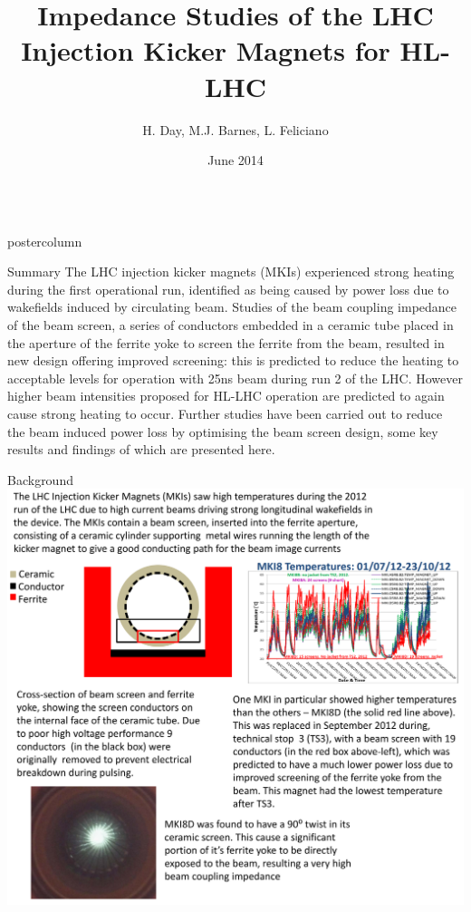 \documentclass[final,hyperref={pdfpagelabels=false}]{beamer}
\title{Impedance Studies of the LHC Injection Kicker Magnets for HL-LHC}
\author{H. Day, M.J. Barnes, L. Feliciano}
\institute[CERN]{CERN, Geneva, Switzerland}
\date[June 2014]{June 2014}
\newlength{\columnheight}
\begin{document}
\begin{frame}
  \begin{columns}
    \begin{column}{.49\textwidth}
      \begin{beamercolorbox}[center,wd=\textwidth]{postercolumn}
        \begin{minipage}[T]{.95\textwidth}  %
          \parbox[t][\columnheight]{\textwidth}{ %
            \begin{block}{Summary}
\small{
The LHC injection kicker magnets (MKIs) experienced strong heating during the first operational run, identified as being caused by power loss due to wakefields induced by circulating beam. Studies of the beam coupling impedance of the beam screen, a series of conductors embedded in a ceramic tube placed in the aperture of the ferrite yoke to screen the ferrite from the beam, resulted in new design offering improved screening: this is predicted to reduce the heating to acceptable levels for operation with 25ns beam during run 2 of the LHC. However higher beam intensities proposed for HL-LHC operation are predicted to again cause strong heating to occur. Further studies have been carried out to reduce the beam induced power loss by optimising the beam screen design, some key results and findings of which are presented here.
}
\end{block}
            \vfill
	\begin{block}{Background}
\includegraphics[width=1.0\textwidth]{introductionPicture.pdf}

\end{block}}
\end{minipage}
\end{beamercolorbox}
\end{column}
\end{columns}
\end{frame}
\end{document}
